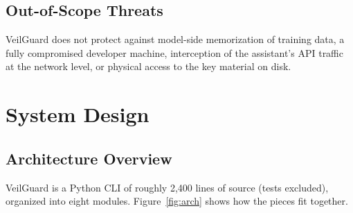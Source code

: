 \documentclass[conference]{IEEEtran}
\begin{document}
\subsection{Out-of-Scope Threats}

VeilGuard does not protect against model-side memorization of training data,
a fully compromised developer machine, interception of the assistant's API
traffic at the network level, or physical access to the key material on disk.


\section{System Design}
\label{sec:design}

\subsection{Architecture Overview}

VeilGuard is a Python CLI of roughly 2{,}400 lines of source (tests excluded),
organized into eight modules. Figure~\ref{fig:arch} shows how the pieces fit
together.
\end{document}
